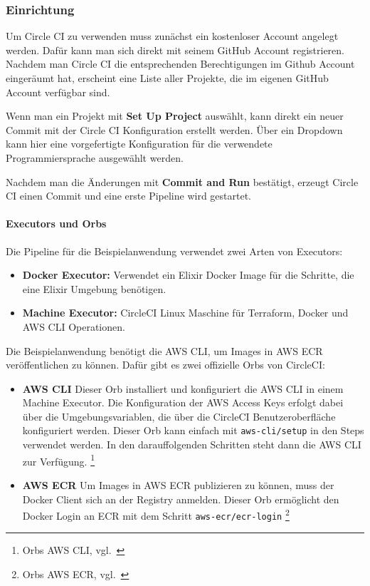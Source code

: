 \subsubsection{Einrichtung}

Um Circle CI zu verwenden muss zunächst ein kostenloser Account angelegt werden.
Dafür kann man sich direkt mit seinem GitHub Account registrieren.
Nachdem man Circle CI die entsprechenden Berechtigungen im Github Account eingeräumt hat, erscheint eine Liste aller Projekte, die im eigenen GitHub Account verfügbar sind.

Wenn man ein Projekt mit \textbf{Set Up Project} auswählt, kann direkt ein neuer Commit mit der Circle CI Konfiguration erstellt werden.
Über ein Dropdown kann hier eine vorgefertigte Konfiguration für die verwendete Programmiersprache ausgewählt werden.

Nachdem man die Änderungen mit \textbf{Commit and Run} bestätigt, erzeugt Circle CI einen Commit und eine erste Pipeline wird gestartet.

\paragraph{Executors und Orbs}

Die Pipeline für die Beispielanwendung verwendet zwei Arten von Executors:

\begin{itemize}
  \item \textbf{Docker Executor:}
  Verwendet ein Elixir Docker Image für die Schritte, die eine Elixir Umgebung benötigen.

  \item \textbf{Machine Executor:}
  CircleCI Linux Maschine für Terraform, Docker und AWS CLI Operationen.
\end{itemize}

Die Beispielanwendung benötigt die AWS CLI, um Images in AWS ECR veröffentlichen zu können.
Dafür gibt es zwei offizielle Orbs von CircleCI:

\begin{itemize}
  \item \textbf{AWS CLI}
  Dieser Orb installiert und konfiguriert die AWS CLI in einem Machine Executor.
  Die Konfiguration der AWS Access Keys erfolgt dabei über die Umgebungsvariablen, die über die CircleCI Benutzeroberfläche konfiguriert werden.
  Dieser Orb kann einfach mit \texttt{aws-cli/setup} in den Steps verwendet werden.
  In den darauffolgenden Schritten steht dann die AWS CLI zur Verfügung.
  \footnote{{Orbs AWS CLI, vgl.~\cite{CIRCLE_ORBS_AWS_CLI}}}

  \item \textbf{AWS ECR}
  Um Images in AWS ECR publizieren zu können, muss der Docker Client sich an der Registry anmelden.
  Dieser Orb ermöglicht den Docker Login an ECR mit dem Schritt \texttt{aws-ecr/ecr-login}
  \footnote{{Orbs AWS ECR, vgl.~\cite{CIRCLE_ORBS_AWS_ECR}}}
\end{itemize}


